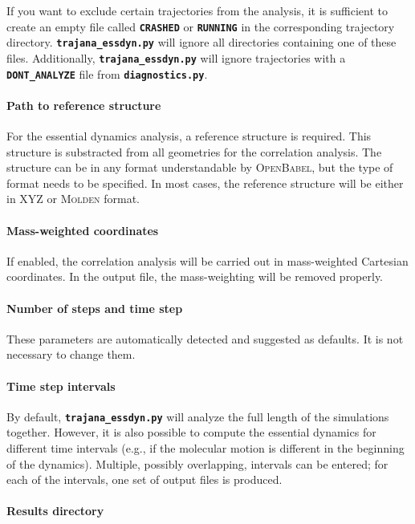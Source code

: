 \documentclass[a4paper,10pt,DIV=15,openany]{scrbook}
\newcommand{\ttt}[1]{\textbf{\texttt{#1}}}
\begin{document}
If you want to exclude certain trajectories from the analysis, it is sufficient to create an empty file called \ttt{CRASHED} or \ttt{RUNNING} in the corresponding trajectory directory. \ttt{trajana\_essdyn.py} will ignore all directories containing one of these files.
Additionally, \ttt{trajana\_essdyn.py} will ignore trajectories with a \ttt{DONT\_ANALYZE} file from \ttt{diagnostics.py}.

\paragraph{Path to reference structure}

For the essential dynamics analysis, a reference structure is required. This structure is substracted from all geometries for the correlation analysis.
The structure can be in any format understandable by \textsc{OpenBabel}, but the type of format needs to be specified.
In most cases, the reference structure will be either in XYZ or \textsc{Molden} format.

\paragraph{Mass-weighted coordinates}

If enabled, the correlation analysis will be carried out in mass-weighted Cartesian coordinates.
In the output file, the mass-weighting will be removed properly.

\paragraph{Number of steps and time step}

These parameters are automatically detected and suggested as defaults.
It is not necessary to change them.

\paragraph{Time step intervals}

By default, \ttt{trajana\_essdyn.py} will analyze the full length of the simulations together. 
However, it is also possible to compute the essential dynamics for different time intervals (e.g., if the molecular motion is different in the beginning of the dynamics).
Multiple, possibly overlapping, intervals can be entered; for each of the intervals, one set of output files is produced.

\paragraph{Results directory}
\end{document}

